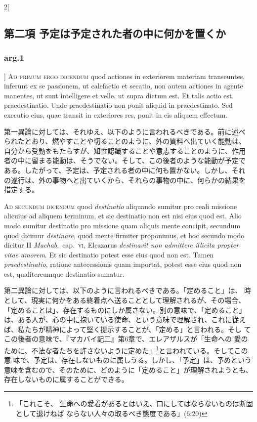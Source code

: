 \documentclass[paper=a4paper,fontsize=10pt,jafontsize=9pt,titlepage]{jlreq}
\begin{document}
\begin{paracol}{2}[\subsection{第二項 予定は予定された者の中に何かを置くか}\subsubsection{arg.1}]
{\scshape Ad primum ergo dicendum} quod actiones in
exteriorem materiam transeuntes, inferunt ex se passionem, ut calefactio
et secatio, non autem actiones in agente manentes, ut sunt intelligere
et velle, ut supra dictum est. Et talis actio est praedestinatio. Unde
praedestinatio non ponit aliquid in praedestinato. Sed executio eius,
quae transit in exteriores res, ponit in eis aliquem effectum.


\switchcolumn


第一異論に対しては、それゆえ、以下のように言われるべきである。前に述べ
られたとおり、燃やすことや切ることのように、外の質料へ出ていく能動は、
自分から受動をもたらすが、知性認識することや意志することのように、作用
者の中に留まる能動は、そうでない。そして、この後者のような能動が予定で
ある。したがって、予定は、予定される者の中に何も置かない。しかし、それ
の遂行は、外の事物へと出ていくから、それらの事物の中に、何らかの結果を
措定する。


\switchcolumn*[\subsubsection{ad.2}]


{\scshape Ad secundum dicendum} quod {\itshape destinatio}
aliquando sumitur pro reali missione alicuius ad aliquem terminum, et
sic destinatio non est nisi eius quod est. Alio modo sumitur destinatio
pro missione quam aliquis mente concipit, secundum quod dicimur
{\itshape destinare}, quod mente firmiter proponimus, et hoc secundo modo dicitur
II {\itshape Machab}.~cap.~{\scshape vi}, Eleazarus {\itshape destinavit non admittere illicita propter
vitae amorem}. Et sic destinatio potest esse eius quod non est. Tamen
{\itshape praedestinatio}, ratione antecessionis quam importat, potest esse eius
quod non est, qualitercumque destinatio sumatur.


\switchcolumn


第二異論に対しては、以下のように言われるべきである。「定めること」は、
時として、現実に何かをある終着点へ送ることとして理解されるが、その場合、
「定めることは」、存在するものにしか属さない。別の意味で、「定めること」
は、ある人が、心の中に抱いている使命、という意味で理解され、これに従え
ば、私たちが精神によって堅く提示することが、「定める」と言われる。そし
てこの後者の意味で、『マカバイ記二』第6章で、エレアザルスが「生命への
愛のために、不法な者たちを許さないように定めた」\footnote{「これこそ、
生命への愛着があるとはいえ、口にしてはならないものは断固として退けねば
ならない人々の取るべき態度である」(6:20)}と言われている。そしてこの意
味で、予定は、存在しないものに属しうる。しかし、「予定」は、予めという
意味を含むので、そのために、どのように「定めること」が理解されようとも、
存在しないものに属することができる。



\end{paracol}
\end{document}

